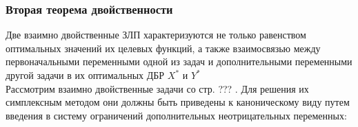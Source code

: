 \subsubsection{Вторая теорема двойственности}
Две взаимно двойственные ЗЛП характеризуются не только равенством оптимальных значений их целевых функций, а также взаимосвязью между первоначальными переменными одной из задач и дополнительными переменными другой задачи в их оптимальных ДБР $X^*$ и $Y^*$\\
Рассмотрим взаимно двойственные задачи со стр. ??? . Для решения их симплексным методом они должны быть приведены к каноническому виду путем введения в систему ограничений дополнительных неотрицательных переменных: